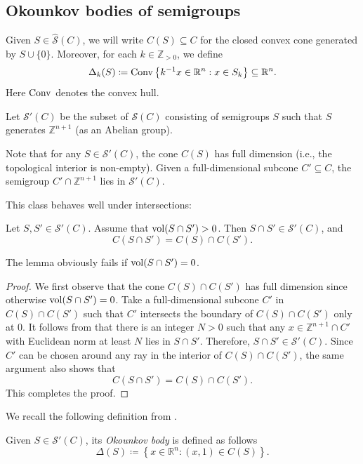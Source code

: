 \subsection{Okounkov bodies of semigroups}
\label{subsec:asg_okoun}
Given $S\in \hat{\mathcal{S}}(C)$, we will write $C(S)\subseteq C$ for the closed convex cone generated by $S\cup \{0\}$. Moreover, for each $k\in \mathbb{Z}_{>0}$, we define
\[
\Delta_k(S)\coloneqq \mathrm{Conv} \left\{k^{-1}x\in \mathbb{R}^n:x\in S_k \right\}\subseteq \mathbb{R}^n.
\]
Here $\mathrm{Conv}$ denotes the convex hull.
\begin{definition}\label{def:almostsg:L284}
    Let $\mathcal{S}'(C)$ be the subset of $\mathcal{S}(C)$ consisting of semigroups $S$ such that $S$ generates $\mathbb{Z}^{n+1}$ (as an Abelian group).
\end{definition}
Note that for any $S\in \mathcal{S}'(C)$, the cone $C(S)$ has full dimension (i.e., the topological interior is non-empty). Given a full-dimensional subcone $C'\subseteq C$, the semigroup $C'\cap \mathbb{Z}^{n+1}$ lies in $\mathcal{S}'(C)$.

This class behaves well under intersections:
\begin{lemma}\label{lma:intersecS'app}
    Let $S,S'\in \mathcal{S}'(C)$. Assume that $\operatorname{vol} (S\cap S')>0$. Then $S\cap S'\in \mathcal{S}'(C)$, and
    \[
    C(S\cap S')=C(S)\cap C(S').
    \]
\end{lemma}
The lemma obviously fails if $\operatorname{vol} (S\cap S')=0$.
\begin{proof}
    We first observe that the cone $C(S)\cap C(S')$ has full dimension since otherwise $\operatorname{vol}(S\cap S')=0$. Take a full-dimensional subcone $C'$ in $C(S)\cap C(S')$ such that $C'$ intersects the boundary of $C(S)\cap C(S')$ only at $0$. It follows from \cite[Theorem~1]{KK12} that there is an integer $N>0$ such that any $x\in \mathbb{Z}^{n+1}\cap C'$ with Euclidean norm at least $N$ lies in $S\cap S'$. Therefore, $S\cap S'\in \mathcal{S}'(C)$.
    Since $C'$ can be chosen around any ray in the interior of $C(S)\cap C(S')$, the same argument also shows that
    \[
    C(S\cap S')=C(S)\cap C(S').
    \]
    This completes the proof.
\end{proof}



We recall the following definition from \cite{KK12}.
\begin{definition}\label{def:Okokkapp}
 Given $S\in \mathcal{S}'(C)$, its \emph{Okounkov body} is defined as follows
\[
\Delta(S)\coloneqq \left\{x\in \mathbb{R}^n:(x,1)\in C(S) \right\}.
\]
\end{definition}

